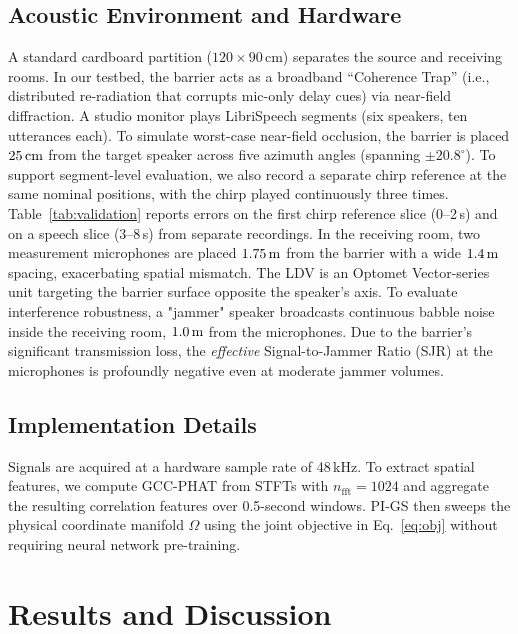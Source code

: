 \documentclass{Interspeech}
\begin{document}
\subsection{Acoustic Environment and Hardware}
A standard cardboard partition ($120\times 90$\,cm) separates the source and receiving rooms. In our testbed, the barrier acts as a broadband ``Coherence Trap'' (i.e., distributed re-radiation that corrupts mic-only delay cues) via near-field diffraction. A studio monitor plays LibriSpeech segments \cite{panayotov2015librispeech} (six speakers, ten utterances each). To simulate worst-case near-field occlusion, the barrier is placed $25\text{\,cm}$ from the target speaker across five azimuth angles (spanning $\pm20.8^\circ$). To support segment-level evaluation, we also record a separate chirp reference at the same nominal positions, with the chirp played continuously three times. Table~\ref{tab:validation} reports errors on the first chirp reference slice (0--2\,s) and on a speech slice (3--8\,s) from separate recordings. In the receiving room, two measurement microphones are placed $1.75\text{\,m}$ from the barrier with a wide $1.4\text{\,m}$ spacing, exacerbating spatial mismatch. The LDV is an Optomet Vector-series unit targeting the barrier surface opposite the speaker's axis. To evaluate interference robustness, a "jammer" speaker broadcasts continuous babble noise inside the receiving room, $1.0\text{\,m}$ from the microphones. Due to the barrier's significant transmission loss, the \emph{effective} Signal-to-Jammer Ratio (SJR) at the microphones is profoundly negative even at moderate jammer volumes.

\subsection{Implementation Details}
Signals are acquired at a hardware sample rate of 48\,kHz. To extract spatial features, we compute GCC-PHAT from STFTs with $n_{\text{fft}}=1024$ and aggregate the resulting correlation features over 0.5-second windows. PI-GS then sweeps the physical coordinate manifold $\Omega$ using the joint objective in Eq.~\ref{eq:obj} without requiring neural network pre-training.

\section{Results and Discussion}
\label{sec:results}
\end{document}
